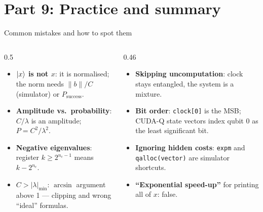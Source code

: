 \documentclass[aspectratio=169,11pt]{beamer}
\newcommand{\key}[1]{{\color{qdark}\textbf{#1}}}
\begin{document}
\section{Part 9: Practice and summary}
\begin{frame}{Common mistakes and how to spot them}
  \begin{columns}[T]
    \begin{column}{0.5\textwidth}
      \small
      \begin{itemize}
        \item \key{$\ket x$ is not $x$}: it is normalised; the norm needs $\|b\|/C$ (simulator) or $P_{\text{success}}$.
        \item \key{Amplitude vs.\ probability}: $C/\lambda$ is an amplitude; $P = C^2/\lambda^2$.
        \item \key{Negative eigenvalues}: register $k \ge 2^{n_c-1}$ means $k - 2^{n_c}$.
        \item \key{$C > |\lambda|_{\min}$}: $\arcsin$ argument above 1 --- clipping and wrong ``ideal'' formulas.
      \end{itemize}
    \end{column}
    \begin{column}{0.46\textwidth}
      \small
      \begin{itemize}
        \item \key{Skipping uncomputation}: clock stays entangled, the system is a mixture.
        \item \key{Bit order}: \texttt{clock[0]} is the MSB; CUDA-Q state vectors index qubit 0 as the least significant bit.
        \item \key{Ignoring hidden costs}: \texttt{expm} and \texttt{qalloc(vector)} are simulator shortcuts.
        \item \key{``Exponential speed-up''} for printing all of $x$: false.
      \end{itemize}
    \end{column}
  \end{columns}
\end{frame}
\end{document}
